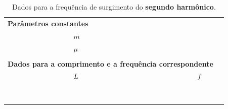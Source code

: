 \begin{table}[!htb]
\forcerectofloat
\caption{Dados para a frequência de surgimento do \textbf{segundo harmônico}.}
\label{Tab:FrequenciaFuncaoComprimento2}
	\begin{center}
		\begin{tabular}{cp{45mm}p{45mm}c}
		\toprule
\multicolumn{2}{l}{\textbf{Parâmetros constantes}}&\\
		\cmidrule{2-3}
		& \cellcolor[gray]{0.89}$m$ &\cellcolor[gray]{0.92} \\
		& \cellcolor[gray]{0.95}$\mu$ & \cellcolor[gray]{0.97}\\
		\cmidrule{2-3}
		\\
\multicolumn{3}{l}{\textbf{Dados para a comprimento e a frequência correspondente}} \\
		\cmidrule{2-3}		
		& $L$ & $f$ &\\
		\cmidrule{2-3}
		& \cellcolor[gray]{0.89} & \cellcolor[gray]{0.92} \\
		& \cellcolor[gray]{0.95} & \cellcolor[gray]{0.97} \\
		& \cellcolor[gray]{0.89} & \cellcolor[gray]{0.92} \\
		& \cellcolor[gray]{0.95} & \cellcolor[gray]{0.97} \\
		& \cellcolor[gray]{0.89} & \cellcolor[gray]{0.92} \\
		& \cellcolor[gray]{0.95} & \cellcolor[gray]{0.97} \\
		& \cellcolor[gray]{0.89} & \cellcolor[gray]{0.92} \\
		& \cellcolor[gray]{0.95} & \cellcolor[gray]{0.97} \\
		\cmidrule{2-3}
		\bottomrule
		\end{tabular}
	\end{center}
\end{table}


